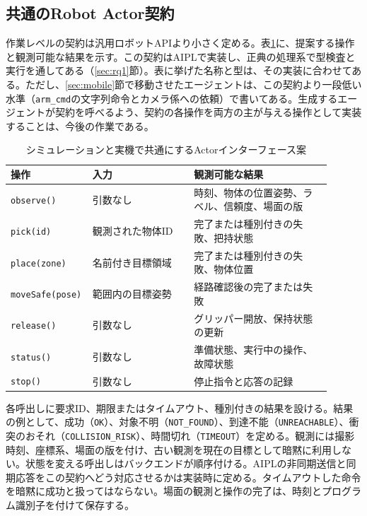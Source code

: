 \documentclass[10pt,letterpaper]{article}
\begin{document}
\subsection{共通のRobot Actor契約}
作業レベルの契約は汎用ロボットAPIより小さく定める。表\ref{tab:api}に、提案する操作と観測可能な結果を示す。この契約はAIPLで実装し、正典の処理系で型検査と実行を通してある（\ref{sec:rq1}節）。表に挙げた名称と型は、その実装に合わせてある。ただし、\ref{sec:mobile}節で移動させたエージェントは、この契約より一段低い水準（\texttt{arm\_cmd}の文字列命令とカメラ係への依頼）で書いてある。生成するエージェントが契約を呼べるよう、契約の各操作を両方の主が与える操作として実装することは、今後の作業である。
\begin{table}[h]
\centering\small
\caption{シミュレーションと実機で共通にするActorインターフェース案}
\label{tab:api}
\begin{tabular}{p{0.17\linewidth}p{0.31\linewidth}p{0.42\linewidth}}
\toprule
操作 & 入力 & 観測可能な結果 \\
\midrule
\texttt{observe()} & 引数なし & 時刻、物体の位置姿勢、ラベル、信頼度、場面の版 \\
\texttt{pick(id)} & 観測された物体ID & 完了または種別付きの失敗、把持状態 \\
\texttt{place(zone)} & 名前付き目標領域 & 完了または種別付きの失敗、物体位置 \\
\texttt{moveSafe(pose)} & 範囲内の目標姿勢 & 経路確認後の完了または失敗 \\
\texttt{release()} & 引数なし & グリッパー開放、保持状態の更新 \\
\texttt{status()} & 引数なし & 準備状態、実行中の操作、故障状態 \\
\texttt{stop()} & 引数なし & 停止指令と応答の記録 \\
\bottomrule
\end{tabular}
\end{table}

各呼出しに要求ID、期限またはタイムアウト、種別付きの結果を設ける。結果の例として、成功（\texttt{OK}）、対象不明（\texttt{NOT\_FOUND}）、到達不能（\texttt{UNREACHABLE}）、衝突のおそれ（\texttt{COLLISION\_RISK}）、時間切れ（\texttt{TIMEOUT}）を定める。観測には撮影時刻、座標系、場面の版を付け、古い観測を現在の目標として暗黙に利用しない。状態を変える呼出しはバックエンドが順序付ける。AIPLの非同期送信と同期応答をこの契約へどう対応させるかは実装時に定める。タイムアウトした命令を暗黙に成功と扱ってはならない。場面の観測と操作の完了は、時刻とプログラム識別子を付けて保存する。
\end{document}

